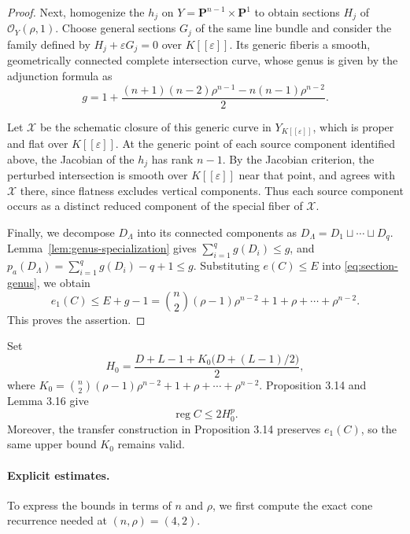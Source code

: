 \documentclass[12pt]{amsart}
\numberwithin{equation}{section}
\theoremstyle{definition}
\theoremstyle{remark}
\numberwithin{equation}{section}
\begin{document}
\begin{proof}
Next, homogenize the $h_j$ on  $Y=\mathbf P^{n-1}\times\mathbf P^1$  to obtain sections $H_j$ of $\mathcal O_Y(\rho,1)$.
Choose general sections $G_j$ of the same line bundle and consider  the family defined by $H_j+\varepsilon G_j=0$ over $K[[\varepsilon]]$.
	Its generic fiberis a smooth,   geometrically connected complete intersection curve, whose genus is given by the adjunction formula as
	\[
	g=1+\frac{(n+1)(n-2)\rho^{n-1}-n(n-1)\rho^{n-2}}2.
	\]
	
		Let $\mathcal X$ be the schematic closure of this generic curve in $Y_{K[[\varepsilon]]}$, which	is proper and flat over $K[[\varepsilon]]$.
	At the generic point of each source component identified above, the   Jacobian of the $h_j$ has rank $n-1$.  By the Jacobian criterion, the perturbed intersection is	smooth over $K[[\varepsilon]]$ near that point,  and agrees with $\mathcal X$ there,  since flatness excludes vertical components. Thus each source component occurs as a distinct reduced component of the special fiber of $\mathcal X$.
	
Finally,  we decompose $D_\Lambda$ into its connected components as $D_\Lambda=D_1\sqcup\cdots\sqcup D_q$. Lemma~\ref{lem:genus-specialization} gives $\sum_{i=1}^q g(D_i)\le g$,  and  $p_a(D_\Lambda)=\sum_{i=1}^q g(D_i)-q+1\le g$.
Substituting $e(C)\le E$ into \eqref{eq:section-genus}, we obtain
	\[
	e_1(C)\le E+g-1=\binom n2(\rho-1)\rho^{n-2}+1+\rho+\cdots+\rho^{n-2}.
	\]
	This proves the assertion.
\end{proof}

Set
\[
H_0=\frac{D+L-1+K_0\bigl(D+(L-1)/2\bigr)}{2},
\]
where $K_0 = \binom{n}{2}(\rho - 1)\rho^{n-2} + 1 + \rho + \cdots + \rho^{n-2}$.
Proposition 3.14 and Lemma 3.16 give
\begin{equation}\label{eq:reg-C-bound}
	\operatorname{reg} C\le 2H_0^p.
\end{equation}
Moreover, the transfer construction in Proposition 3.14	preserves $e_1(C)$, so the same upper bound $K_0$ remains valid.

\paragraph{\textbf{Explicit estimates.}}
\label{subsec:explicit-bound}
 To express  the bounds in terms of $n$ and $\rho$,  we first compute the exact cone recurrence needed at $(n, \rho) = (4, 2)$.
 
\end{document}

